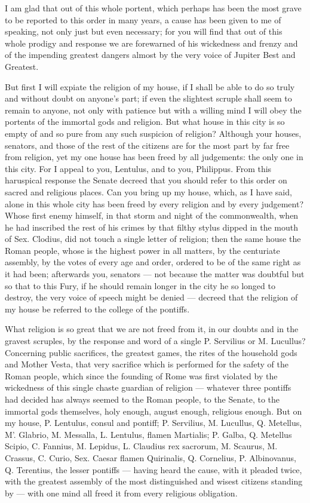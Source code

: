  I am glad that out of this whole portent, which perhaps has been the most grave to be reported to this order in many years, a cause has been given to me of speaking, not only just but even necessary; for you will find that out of this whole prodigy and response we are forewarned of his wickedness and frenzy and of the impending greatest dangers almost by the very voice of Jupiter Best and Greatest.

 But first I will expiate the religion of my house, if I shall be able to do so truly and without doubt on anyone's part; if even the slightest scruple shall seem to remain to anyone, not only with patience but with a willing mind I will obey the portents of the immortal gods and religion. But what house in this city is so empty of and so pure from any such suspicion of religion? Although your houses, senators, and those of the rest of the citizens are for the most part by far free from religion, yet my one house has been freed by all judgements: the only one in this city. For I appeal to you, Lentulus, and to you, Philippus. From this haruspical response the Senate decreed that you should refer to this order on sacred and religious places. Can you bring up my house, which, as I have said, alone in this whole city has been freed by every religion and by every judgement? Whose first enemy himself, in that storm and night of the commonwealth, when he had inscribed the rest of his crimes by that filthy stylus dipped in the mouth of Sex. Clodius, did not touch a single letter of religion; then the same house the Roman people, whose is the highest power in all matters, by the centuriate assembly, by the votes of every age and order, ordered to be of the same right as it had been; afterwards you, senators --- not because the matter was doubtful but so that to this Fury, if he should remain longer in the city he so longed to destroy, the very voice of speech might be denied --- decreed that the religion of my house be referred to the college of the pontiffs.

 What religion is so great that we are not freed from it, in our doubts and in the gravest scruples, by the response and word of a single P. Servilius or M. Lucullus? Concerning public sacrifices, the greatest games, the rites of the household gods and Mother Vesta, that very sacrifice which is performed for the safety of the Roman people, which since the founding of Rome was first violated by the wickedness of this single chaste guardian of religion --- whatever three pontiffs had decided has always seemed to the Roman people, to the Senate, to the immortal gods themselves, holy enough, august enough, religious enough. But on my house, P. Lentulus, consul and pontiff; P. Servilius, M. Lucullus, Q. Metellus, M'. Glabrio, M. Messalla, L. Lentulus, flamen Martialis; P. Galba, Q. Metellus Scipio, C. Fannius, M. Lepidus, L. Claudius rex sacrorum, M. Scaurus, M. Crassus, C. Curio, Sex. Caesar flamen Quirinalis, Q. Cornelius, P. Albinovanus, Q. Terentius, the lesser pontiffs --- having heard the cause, with it pleaded twice, with the greatest assembly of the most distinguished and wisest citizens standing by --- with one mind all freed it from every religious obligation.

